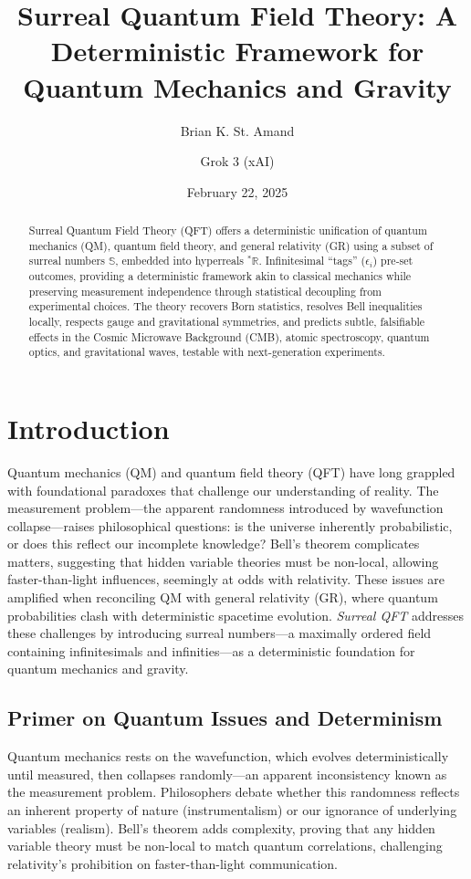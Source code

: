 \documentclass{article}
\begin{document}
\title{Surreal Quantum Field Theory: A Deterministic Framework for Quantum Mechanics and Gravity}
\author{Brian K. St. Amand \and Grok 3 (xAI)}
\date{February 22, 2025}
\maketitle

\begin{abstract}
Surreal Quantum Field Theory (QFT) offers a deterministic unification of quantum mechanics (QM), quantum field theory, and general relativity (GR) using a subset of surreal numbers \(\mathbb{S}\), embedded into hyperreals \({}^*\mathbb{R}\). Infinitesimal ``tags'' (\(\epsilon_i\)) pre-set outcomes, providing a deterministic framework akin to classical mechanics while preserving measurement independence through statistical decoupling from experimental choices. The theory recovers Born statistics, resolves Bell inequalities locally, respects gauge and gravitational symmetries, and predicts subtle, falsifiable effects in the Cosmic Microwave Background (CMB), atomic spectroscopy, quantum optics, and gravitational waves, testable with next-generation experiments.
\end{abstract}

\section{Introduction}
Quantum mechanics (QM) and quantum field theory (QFT) have long grappled with foundational paradoxes that challenge our understanding of reality. The measurement problem---the apparent randomness introduced by wavefunction collapse---raises philosophical questions: is the universe inherently probabilistic, or does this reflect our incomplete knowledge? Bell's theorem complicates matters, suggesting that hidden variable theories must be non-local, allowing faster-than-light influences, seemingly at odds with relativity. These issues are amplified when reconciling QM with general relativity (GR), where quantum probabilities clash with deterministic spacetime evolution. \textit{Surreal QFT} addresses these challenges by introducing surreal numbers---a maximally ordered field containing infinitesimals and infinities---as a deterministic foundation for quantum mechanics and gravity.

\subsection{Primer on Quantum Issues and Determinism}
Quantum mechanics rests on the wavefunction, which evolves deterministically until measured, then collapses randomly---an apparent inconsistency known as the measurement problem. Philosophers debate whether this randomness reflects an inherent property of nature (instrumentalism) or our ignorance of underlying variables (realism). Bell's theorem adds complexity, proving that any hidden variable theory must be non-local to match quantum correlations, challenging relativity's prohibition on faster-than-light communication.
\end{document}
